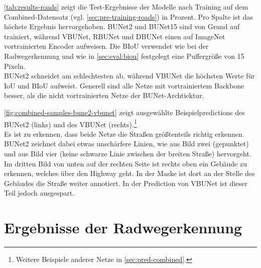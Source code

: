 \autoref{tab:results-roads} zeigt die Test-Ergebnisse der Modelle nach Training auf dem Combined-Datensatz 
(vgl. \autoref{sec:pre-training-roads}) in Prozent. Pro Spalte ist das höchste Ergebnis hervorgehoben. 
\ac{BUNet2} und \ac{BUNet15} sind von Grund auf trainiert, während \ac{VBUNet}, \ac{RBUNet} und \ac{DBUNet} einen auf 
ImageNet vortrainierten Encoder aufweisen. Die \ac{BIoU} verwendet wie bei der Radwegerkennung und wie in \autoref{sec:eval:biou} 
festgelegt eine Puffergröße von 15 Pixeln. \\ 
BUNet2 schneidet am schlechtesten ab, während VBUNet die höchsten Werte für IoU und BIoU aufweist. 
Generell sind alle Netze mit vortrainiertem Backbone besser, als die nicht vortrainierten Netze 
der BUNet-Archtiektur. 

\autoref{fig:combined-samples-bune2-vbunet} zeigt ausgewählte Beispielpredictions des \ac{BUNet2} (links) und 
des \ac{VBUNet} (rechts).\footnote{Weitere Beispiele anderer Netze in \autoref{sec:pred-combined}.} \\
Es ist zu erkennen, dass beide Netze die Straßen größtenteils richtig erkennen. 
BUNet2 zeichnet dabei etwas unschärfere Linien, wie aus Bild zwei (gepunktet) und aus Bild vier 
(keine schwarze Linie zwischen der breiten Straße) hervorgeht. Im dritten Bild von unten 
auf der rechten Seite ist rechts oben ein Gebäude zu erkennen, welches über den Highway geht. 
In der Maske ist dort an der Stelle des Gebäudes die Straße weiter annotiert. 
In der Prediction von VBUNet ist dieser Teil jedoch ausgespart.  

\section{Ergebnisse der Radwegerkennung}

